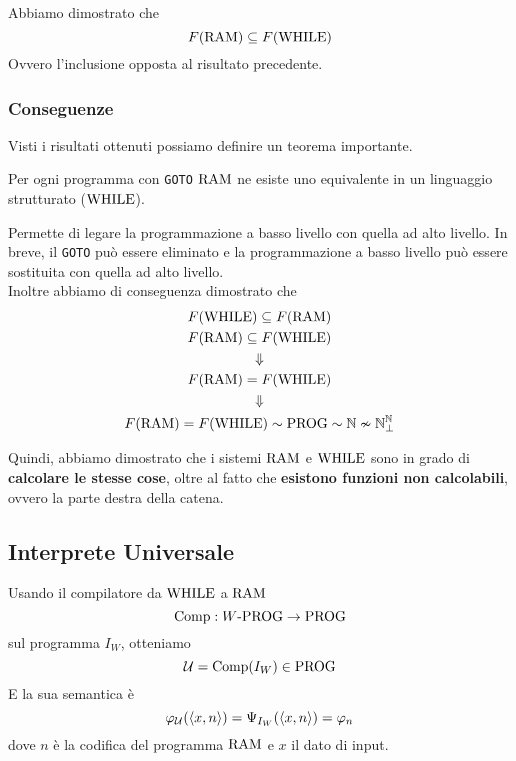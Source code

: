 Abbiamo dimostrato che
$$ F(\text{RAM}) \subseteq F(\text{WHILE}) $$
Ovvero l'inclusione opposta al risultato precedente.\\

\subsubsection{Conseguenze}
Visti i risultati ottenuti possiamo definire un teorema importante.\\

\begin{theor}
	Per ogni programma con \texttt{GOTO} $\text{RAM}$ ne esiste uno equivalente in un linguaggio strutturato ($\text{WHILE}$).\\
\end{theor}

Permette di legare la programmazione a basso livello con quella ad alto livello. In breve, il \texttt{GOTO} può essere eliminato e la programmazione a basso livello può essere sostituita con quella ad alto livello.\\

Inoltre abbiamo di conseguenza dimostrato che
\begin{gather*}
	F(\text{WHILE}) \subseteq F(\text{RAM}) \\
	F (\text{RAM}) \subseteq F(\text{WHILE}) \\
	\Downarrow \\
	F(\text{RAM}) = F(\text{WHILE}) \\
	\Downarrow \\
	F(\text{RAM}) = F(\text{WHILE}) \sim \text{PROG} \sim \mathbb{N} \nsim \mathbb{N}^\mathbb{N}_\bot
\end{gather*}

Quindi, abbiamo dimostrato che i sistemi $\text{RAM}$ e $\text{WHILE}$ sono in grado di \textbf{calcolare le stesse cose}, oltre al fatto che \textbf{esistono funzioni non calcolabili}, ovvero la parte destra della catena. \\

\subsection{Interprete Universale}
Usando il compilatore da $\text{WHILE}$ a $\text{RAM}$
$$ \text{Comp}: W\text{-PROG} \rightarrow \text{PROG} $$
sul programma $I_W$, otteniamo
$$ \mathcal{U} = \text{Comp}(I_W) \in \text{PROG} $$
E la sua semantica è 
$$ \varphi_{\mathcal{U}} (\langle x,n \rangle) = \Psi_{I_W} (\langle x,n \rangle) = \varphi_n $$
dove $n$ è la codifica del programma $\text{RAM}$ e $x$ il dato di input.\\


